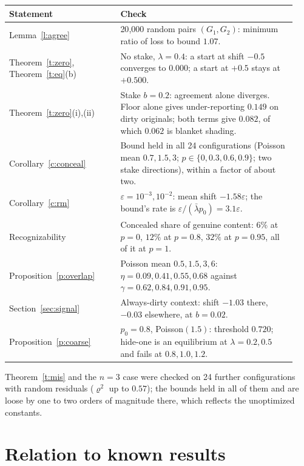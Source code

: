 \documentclass[11pt]{article}
\theoremstyle{definition}
\theoremstyle{remark}
\newcommand{\lbar}{\bar\lambda}
\begin{document}
\begin{center}
\begin{tabular}{@{}p{0.36\linewidth}p{0.58\linewidth}@{}}
\toprule
Statement & Check \\
\midrule
Lemma~\ref{l:agree} & 20{,}000 random pairs $(G_1,G_2)$: minimum ratio of loss to bound $1.07$. \\
Theorem~\ref{t:zero}, Theorem~\ref{t:eq}(b) & No stake, $\lambda=0.4$: a start at shift $-0.5$ converges to $0.000$; a start at $+0.5$ stays at $+0.500$. \\
Theorem~\ref{t:zero}(i),(ii) & Stake $b=0.2$: agreement alone diverges. Floor alone gives under-reporting $0.149$ on dirty originals; both terms give $0.082$, of which $0.062$ is blanket shading. \\
Corollary~\ref{c:conceal} & Bound held in all 24 configurations (Poisson mean $0.7,1.5,3$; $p\in\{0,0.3,0.6,0.9\}$; two stake directions), within a factor of about two. \\
Corollary~\ref{c:rm} & $\varepsilon=10^{-3},10^{-2}$: mean shift $-1.58\varepsilon$; the bound's rate is $\varepsilon/(\lbar p_0)=3.1\varepsilon$. \\
Recognizability & Concealed share of genuine content: $6\%$ at $p=0$, $12\%$ at $p=0.8$, $32\%$ at $p=0.95$, all of it at $p=1$. \\
Proposition~\ref{p:overlap} & Poisson mean $0.5,1.5,3,6$: $\eta=0.09,0.41,0.55,0.68$ against $\gamma=0.62,0.84,0.91,0.95$. \\
Section~\ref{sec:signal} & Always-dirty context: shift $-1.03$ there, $-0.03$ elsewhere, at $b=0.02$. \\
Proposition~\ref{p:coarse} & $p_0=0.8$, Poisson$(1.5)$: threshold $0.720$; hide-one is an equilibrium at $\lambda=0.2,0.5$ and fails at $0.8,1.0,1.2$. \\
\bottomrule
\end{tabular}
\end{center}

Theorem~\ref{t:mis} and the $n=3$ case were checked on 24 further configurations with random residuals ($\varrho^2$ up to $0.57$); the bounds held in all of them and are loose by one to two orders of magnitude there, which reflects the unoptimized constants.

\section{Relation to known results}
\end{document}
